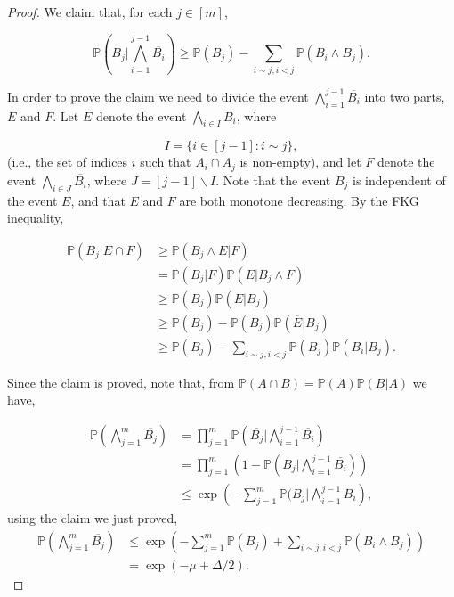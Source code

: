 \documentclass[12pt,twoside,a4paper,bibliography=totocnumbered]{book}
\numberwithin{equation}{section}
\let\backslash=\smallsetminus
\theoremstyle{remark}
\begin{document}
\begin{proof}
We claim that, for each $j \in [m]$,

$$\mathbb{P} \left( B_j | \bigwedge_{i=1}^{j-1} \overline{B_i} \right) \geq \mathbb{P}(B_j) - \sum_{i\sim j, i<j} \mathbb{P}(B_i \wedge B_j). $$

In order to prove the claim we need to divide the event $\bigwedge^{j-1}_ {i=1} \overline{B_i}$ into two parts, $E$ and $F$. Let $E$ denote the event $\bigwedge_{i \in I} \overline{B_i}$, where

$$ I = \{ i \in [j-1]\colon i \sim j \},$$
(i.e., the set of indices $i$ such that $A_i \cap A_j$ is non-empty), and let $F$ denote the event $\bigwedge_{i \in J} \overline{B_i}$, where $J=[j-1]\backslash I$. Note that the event $B_j$ is independent of the event $E$, and that $E$ and $F$ are both monotone decreasing. By the FKG inequality,

\begin{align*}
\mathbb{P}(B_j | E \cap F) & \geq \mathbb{P}(B_j \wedge E | F)\\
& = \mathbb{P}(B_j | F) \mathbb{P}(E | B_j \wedge F)\\
& \geq \mathbb{P}(B_j)\mathbb{P}(E|B_j)\\
& \geq \mathbb{P}(B_j) - \mathbb{P}(B_j) \mathbb{P}(\overline{E} | B_j)\\
& \geq \mathbb{P}(B_j) - \sum_{i \sim j, i < j}\mathbb{P}(B_j) \mathbb{P}(B_i | B_j).
\end{align*}

Since the claim is proved, note that, from $\mathbb{P}(A\cap B) = \mathbb{P}(A)\mathbb{P}(B|A)$ we have,

\begin{align*}
\mathbb{P}\left( \bigwedge_{j=1}^m \overline{B_j} \right) &= \prod_{j=1}^m \mathbb{P}\left( \overline{B_j} | \bigwedge_{i = 1}^{j-1} \overline{B_i}\right)\\
& = \prod_{j=1}^m \left( 1 - \mathbb{P}\left(B_j | \bigwedge_{i = 1}^{j-1} \overline{B_i}\right)\right)\\
& \leq \exp\left(- \sum_{j=1}^m \mathbb{P}(B_j | \bigwedge_{i=1}^{j-1} \overline{B_i}\right),
\end{align*}
using the claim we just proved,
\begin{align*}
\mathbb{P}\left( \bigwedge_{j=1}^m \overline{B_j} \right) &\leq  \exp\left(- \sum_{j=1}^m \mathbb{P}(B_j) + \sum_{i \sim j, i< j} \mathbb{P}(B_i \wedge B_j)\right)\\
& = \exp( - \mu + \Delta /2).
\end{align*}


\end{proof}
\end{document}

